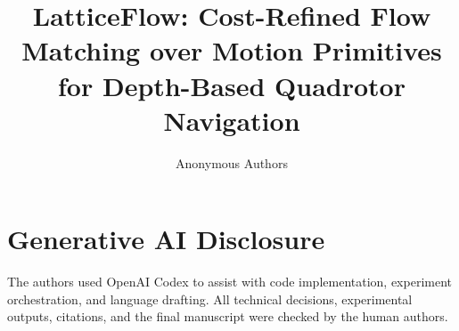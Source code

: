 \documentclass[letterpaper,10pt,conference]{ieeeconf}
\title{LatticeFlow: Cost-Refined Flow Matching over Motion Primitives for Depth-Based Quadrotor Navigation}
\author{Anonymous Authors}
\begin{document}
\maketitle









\section*{Generative AI Disclosure}
The authors used OpenAI Codex to assist with code implementation, experiment orchestration, and language drafting. All technical decisions, experimental outputs, citations, and the final manuscript were checked by the human authors.



\end{document}
